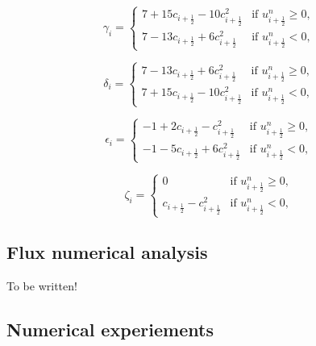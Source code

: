 \begin{equation}
	\label{chp-sec-flux:numerical-flux-stencil-gamma}
	\gamma_i =  
    	\begin{cases}
		7 + 15c_{i+\frac{1}{2}} - 10c_{i+\frac{1}{2}}^2 
		& \text{if } u_{i+\frac{1}{2}}^n \geq 0,\\
		7 - 13c_{i+\frac{1}{2}}  +  6c_{i+\frac{1}{2}}^2 & \text{if } u_{i+\frac{1}{2}}^n<0,
    	\end{cases}
\end{equation}

\begin{equation}
	\label{chp-sec-flux:numerical-flux-stencil-delta}
	\delta_i =  
    	\begin{cases}
		7 - 13c_{i+\frac{1}{2}} +  6c_{i+\frac{1}{2}}^2 & \text{if } u_{i+\frac{1}{2}}^n \geq 0,\\
		7 + 15c_{i+\frac{1}{2}} - 10c_{i+\frac{1}{2}}^2 & \text{if } u_{i+\frac{1}{2}}^n<0,
    	\end{cases}
\end{equation}

\begin{equation}
	\label{chp-sec-flux:numerical-flux-stencil-epsilon}
	\epsilon_i =  
    	\begin{cases}
		-1 +  2c_{i+\frac{1}{2}} -   c_{i+\frac{1}{2}}^2 
		& \text{if } u_{i+\frac{1}{2}}^n \geq 0,\\
		-1 - 5c_{i+\frac{1}{2}} +  6c_{i+\frac{1}{2}}^2 & \text{if } u_{i+\frac{1}{2}}^n<0,
    	\end{cases}
\end{equation}

\begin{equation}
	\label{chp-sec-flux:numerical-flux-stencil-zeta}
	\zeta_i =  
    	\begin{cases}
		0 & \text{if } u_{i+\frac{1}{2}}^n \geq 0,\\
		c_{i+\frac{1}{2}}-   c_{i+\frac{1}{2}}^2 & \text{if } u_{i+\frac{1}{2}}^n<0,
    	\end{cases}
\end{equation}

\subsection{Flux numerical analysis }
To be written!

\subsection{Numerical experiements}
